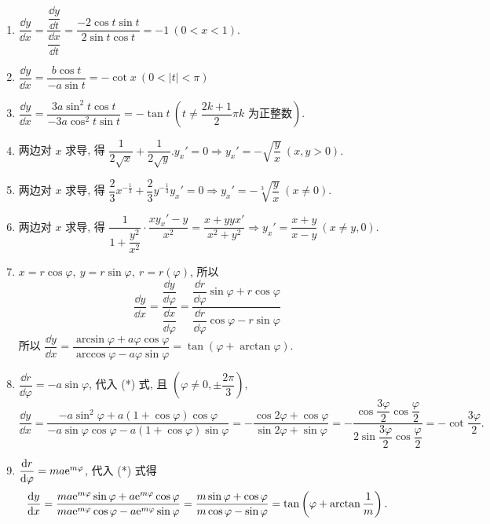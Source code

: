 \begin{solution}
    \begin{enumerate}[label=(\arabic{*})]
        \item $\dfrac{\dd y}{\dd x}=\dfrac{\dfrac{\dd y}{\dd t}}{\dfrac{\dd x}{\dd t}}=\dfrac{-2\cos t\sin t}{2\sin t\cos t}=-1~  ( 0 <x < 1). $
        \item $\dfrac{\dd y}{\dd x}=\dfrac{b\cos t}{-a\sin t}=-\cot x~  ( 0 <\left| t\right|  < \pi ) $
        \item $\dfrac{\dd y}{\dd x}=\dfrac{3a\sin ^{2}t\cos t}{-3a\cos ^{2}t\sin t}=-\tan t~  ( t\neq  \dfrac{2k+1}{2}\pi k\text{ 为正整数}) .$
        \item 两边对 $x$ 求导, 得 $\dfrac{1}{2\sqrt{x}}+\dfrac{1}{2\sqrt{y}}.y_{x}'=0\Rightarrow y_{x}'=-\sqrt{\dfrac{y}{x}}~  ( x,y > 0) .$
        \item 两边对 $x$ 求导, 得 $\dfrac{2}{3}x^{-\frac{1}{3}}+\dfrac{2}{3}y^{-\frac{1}{3}}y_{x}'=0\Rightarrow y_{x}'=-\sqrt[3] {\dfrac{y}{x}}~  ( x\neq  0) .$
        \item 两边对 $x$ 求导, 得 $\dfrac{1}{1+\dfrac{y^{2}}{x^{2}}}\cdot \dfrac{xy_{x}'-y}{x^{2}}=\dfrac{x+yyx'}{x^{2}+y^{2}}\Rightarrow y_{x}'=\dfrac{x+y}{x-y}~  ( x\neq  y,0) .$
        \item $x=r\cos\varphi,~y=r\sin\varphi,~r=r(\varphi)$, 所以
              \begin{equation}
                  \dfrac{\dd y}{\dd x}=\dfrac{\dfrac{\dd y}{\dd \varphi }}{\dfrac{\dd x}{\dd \varphi }}=\dfrac{\dfrac{\dd r}{\dd \varphi }\sin \varphi +r\cos \varphi }{\dfrac{\dd r}{\dd \varphi }\cos \varphi -r\sin \varphi }\tag{*}
              \end{equation}
              所以 $\dfrac{\dd y}{\dd x}=\dfrac{\arcsin \varphi +a\varphi \cos \varphi }{\arccos \varphi -a\varphi \sin \varphi }=\tan \left( \varphi +\arctan \varphi \right) .$
        \item $\dfrac{\dd r}{\dd \varphi}=-a\sin\varphi$, 代入 (*) 式, 且 $(\varphi\neq0,\pm\dfrac{2\pi}{3})$,
              $$\dfrac{\dd y}{\dd x}=\dfrac{-a\sin ^{2}\varphi +a\left( 1+\cos \varphi \right) \cos \varphi }{-a\sin \varphi \cos \varphi -a\left( 1+\cos \varphi \right) \sin \varphi }=-\dfrac{\cos 2\varphi +\cos \varphi }{\sin 2\varphi +\sin \varphi }=-\dfrac{\cos \dfrac{3\varphi }{2}\cos \dfrac{\varphi }{2}}{2\sin \dfrac{3\varphi }{2}\cos \dfrac{\varphi }{2}}=-\cot\dfrac{3\varphi}{2}.$$
        \item $\dfrac{\dd r}{\dd \varphi }=ma\mathrm{e} ^{m\varphi }$, 代入 (*) 式得
              $$\dfrac{\dd y}{\dd x}=\dfrac{ma\mathrm{e} ^{m\varphi }\sin \varphi +a\mathrm{e} ^{m\varphi }\cos \varphi }{ma\mathrm{e} ^{m\varphi }\cos \varphi -a\mathrm{e} ^{m\varphi }\sin \varphi }=\dfrac{m\sin \varphi +\cos \varphi }{m\cos \varphi -\sin \varphi }=\tan \left( \varphi +\arctan \dfrac{1}{m}\right) .$$
    \end{enumerate}
\end{solution}

